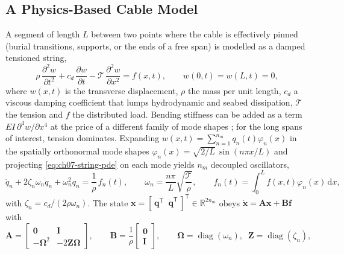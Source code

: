 \subsection{A Physics-Based Cable Model}
\label{subsec:cable-model}
A segment of length $L$ between two points where the cable is effectively pinned (burial transitions, supports, or the ends of a free span) is modelled as a damped tensioned string,
\begin{equation}
\rho\,\frac{\partial^{2} w}{\partial t^{2}}+c_d\,\frac{\partial w}{\partial t}-\mathcal{T}\,\frac{\partial^{2} w}{\partial x^{2}}=f(x,t),
\qquad w(0,t)=w(L,t)=0,
\label{eq:ch07-string-pde}
\end{equation}
where $w(x,t)$ is the transverse displacement, $\rho$ the mass per unit length, $c_d$ a viscous damping coefficient that lumps hydrodynamic and seabed dissipation, $\mathcal{T}$ the tension and $f$ the distributed load. Bending stiffness can be added as a term $EI\,\partial^{4}w/\partial x^{4}$ at the price of a different family of mode shapes \cite{irvine_linear_1974}; for the long spans of interest, tension dominates. Expanding $w(x,t)=\sum_{n=1}^{n_m} q_n(t)\varphi_n(x)$ in the spatially orthonormal mode shapes $\varphi_n(x)=\sqrt{2/L}\,\sin(n\pi x/L)$ and projecting \eqref{eq:ch07-string-pde} on each mode yields $n_m$ decoupled oscillators,
\begin{equation}
\ddot q_n+2\zeta_n\omega_n\dot q_n+\omega_n^{2}q_n=\frac{1}{\rho}\,f_n(t),
\qquad
\omega_n=\frac{n\pi}{L}\sqrt{\frac{\mathcal{T}}{\rho}},
\qquad
f_n(t)=\int_0^{L} f(x,t)\varphi_n(x)\,\mathrm{d}x,
\label{eq:ch07-modal}
\end{equation}
with $\zeta_n=c_d/(2\rho\omega_n)$. The state $\mathbf{x}=[\,\mathbf{q}^{\mathsf T}\;\;\dot{\mathbf{q}}^{\mathsf T}\,]^{\mathsf T}\in\mathbb{R}^{2n_m}$ obeys $\dot{\mathbf{x}}=\mathbf{A}\mathbf{x}+\mathbf{B}\mathbf{f}$ with
\begin{equation}
\mathbf{A}=
\begin{bmatrix}
\mathbf{0} & \mathbf{I}\\ -\boldsymbol{\Omega}^{2} & -2\mathbf{Z}\boldsymbol{\Omega}
\end{bmatrix},
\qquad
\mathbf{B}=\frac{1}{\rho}
\begin{bmatrix}
\mathbf{0}\\ \mathbf{I}
\end{bmatrix},
\qquad
\boldsymbol{\Omega}=\operatorname{diag}(\omega_n),\;\;\mathbf{Z}=\operatorname{diag}(\zeta_n),
\label{eq:ch07-modal-ss}
\end{equation}

